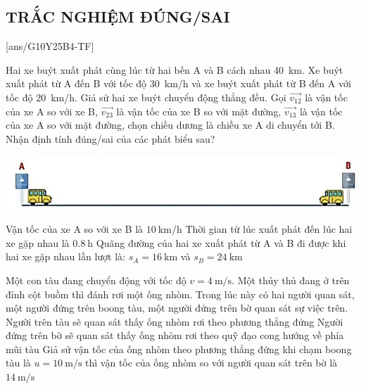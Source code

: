 \subsection{TRẮC NGHIỆM ĐÚNG/SAI}
\setcounter{ex}{0}
[ans/G10Y25B4-TF]
\begin{ex}
	Hai xe buýt xuất phát cùng lúc từ hai bến A và B cách nhau \SI{40}{\kilo\metre}. Xe buýt xuất phát từ A đến B với tốc độ \SI{30}{\kilo\metre/\hour} và xe buýt xuất phát từ B đến A với tốc độ \SI{20}{\kilo\metre/\hour}. Giả sử hai xe buýt chuyển động thẳng đều. Gọi $\overrightarrow{v_{12}}$ là vận tốc của xe A so với xe B, $\overrightarrow{v_{23}}$ là vận tốc của xe B so với mặt đường, $\overrightarrow{v_{13}}$ là vận tốc của xe A so với mặt đường, chọn chiều dương là chiều xe A di chuyển tới B. Nhận định tính đúng/sai của các phát biểu sau?
	\begin{center}
		\includegraphics[scale=0.8]{figs/G10Y25B4-7}
	\end{center}
	{Vận tốc của xe A so với xe B là $\SI{10}{\kilo\metre/\hour}$}
	{\True Thời gian từ lúc xuất phát đến lúc hai xe gặp nhau là $\SI{0.8}{\hour}$}
	{Quãng đường của hai xe xuất phát từ A và B đi được khi hai xe gặp nhau lần lượt là: $s_A = \SI{16}{\kilo\metre}$ và $s_B = \SI{24}{\kilo\metre}$}
	\loigiai{}
\end{ex}
\begin{ex}
	Một con tàu đang chuyển động với tốc độ $v = \SI{4}{\metre/\second}$. Một thủy thủ đang ở trên đỉnh cột buồm thì đánh rơi một ống nhòm. Trong lúc này có hai người quan sát, một người đứng trên boong tàu, một người đứng trên bờ quan sát sự việc trên.
	{\True Người trên tàu sẽ quan sát thấy ống nhòm rơi theo phương thẳng đứng}
	{\True Người đứng trên bờ sẽ quan sát thấy ống nhòm rơi theo quỹ đạo cong hướng về phía mũi tàu}
	{Giả sử vận tốc của ống nhòm theo phương thẳng đứng khi chạm boong tàu là $u = \SI{10}{\metre/\second}$ thì vận tốc của ống nhòm so với người quan sát trên bờ là $\SI{14}{\metre/\second}$}
\end{ex}

